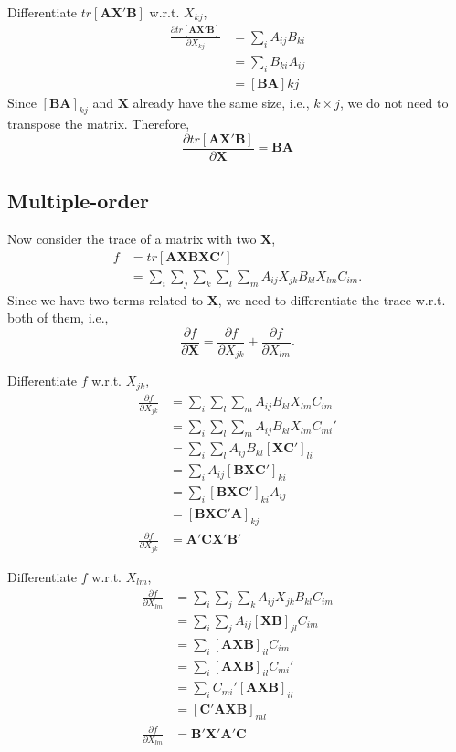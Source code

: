 \documentclass[10pt]{article}
\begin{document}
Differentiate $ tr[\bm{AX}'\bm{B}] $ w.r.t. $ X_{kj} $,
\begin{align*}
\frac{\partial tr[\bm{AX}'\bm{B}] }{\partial X_{kj} }
&= \sum\limits_{i} A_{ij}B_{ki}\\
&= \sum\limits_{i} B_{ki}A_{ij}\\
&= [\bm{BA}]kj
\end{align*}
Since $ [\bm{BA}]_{kj} $ and $ \bm{X} $ already have the same size, i.e., $ k  \times j $, we do not need to transpose the matrix. Therefore,
\begin{equation}
		\frac{\partial tr[\bm{AX}'\bm{B}] }{\partial \bm{X} } = \bm{BA} \label{eqn:AX'B}
\end{equation}



\subsection{Multiple-order}
Now consider the trace of a matrix with two $ \bm{X} $,
\begin{align}
		f &= tr[\bm{AXBXC}']\\
		&= \sum\limits_{i}\sum\limits_{j}\sum\limits_{k}\sum\limits_{l}\sum\limits_{m}
		A_{ij}X_{jk}B_{kl}X_{lm}C_{im}.
\end{align}
Since we have two terms related to $ \bm{X} $, we need to differentiate the trace
w.r.t. both of them, i.e., 
\begin{equation*}
\frac{\partial f }{\partial \bm{X} } = \frac{\partial f }{\partial X_{jk} }
 + \frac{\partial f }{\partial X_{lm} }.
\end{equation*}


Differentiate $ f $ w.r.t. $ X_{jk} $,
\begin{align}
\frac{\partial f }{\partial X_{jk} }&= \sum\limits_{i}\sum\limits_{l}\sum\limits_{m}
A_{ij}B_{kl}X_{lm}C_{im}\\
&= \sum\limits_{i}\sum\limits_{l}\sum\limits_{m}A_{ij}B_{kl}X_{lm}C_{mi}'		\\
&= \sum\limits_{i}\sum\limits_{l}A_{ij}B_{kl}[\bm{XC}']_{li}		\\
&= \sum\limits_{i}A_{ij}[\bm{BXC}']_{ki}		\\
&= \sum\limits_{i}[\bm{BXC}']_{ki}A_{ij}		\\
&= [\bm{BXC}'\bm{A}]_{kj}\\
\frac{\partial f }{\partial X_{jk} }&= \bm{A}'\bm{C}\bm{X}'\bm{B}'
\end{align}

Differentiate $ f $ w.r.t. $ X_{lm} $,
\begin{align}
\frac{\partial f }{\partial X_{lm} }
&=\sum\limits_{i}\sum\limits_{j}\sum\limits_{k}A_{ij}X_{jk}B_{kl}C_{im}\\
&=\sum\limits_{i}\sum\limits_{j}A_{ij}[\bm{XB}]_{jl}C_{im}\\
&=\sum\limits_{i}[\bm{AXB}]_{il}C_{im}\\
&=\sum\limits_{i}[\bm{AXB}]_{il}C_{mi}'\\
&=\sum\limits_{i}C_{mi}'[\bm{AXB}]_{il}\\
&=[\bm{C}'\bm{AXB}]_{ml}\\
\frac{\partial f }{\partial X_{lm} }&= \bm{B}'\bm{X}'\bm{A}'\bm{C}
\end{align}
\end{document}
